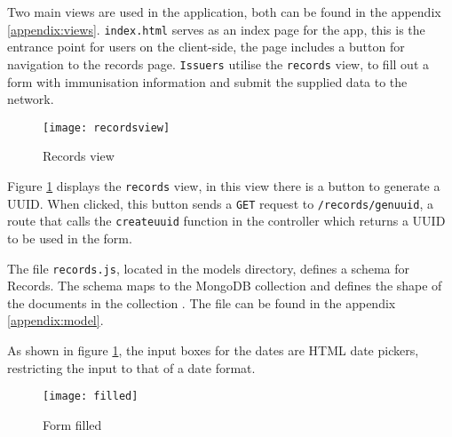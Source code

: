 Two main views are used in the application, both can be found in the appendix \ref{appendix:views}. 
\lstinline{index.html} serves as an index page for the app, this is the entrance point for users on the client-side, the page includes a button for navigation to the records page.
\lstinline{Issuers} utilise the \lstinline{records} view, to fill out a form with immunisation information and submit the supplied data to the network. 

\begin{figure}[H]
  \texttt{[image: recordsview]}
  \caption{Records view}
  \label{fig:recordsview}
\end{figure}

Figure \ref{fig:recordsview} displays the \lstinline{records} view, in this view there is a button to generate a UUID. 
When clicked, this button sends a \lstinline{GET} request to \lstinline{/records/genuuid}, a route that calls the \lstinline{createuuid} function in the controller which returns a UUID to be used in the form. 

The file \lstinline{records.js}, located in the models directory, defines a schema for Records. 
The schema maps to the MongoDB collection and defines the shape of the documents in the collection \cite{noauthor_mongoose_nodate}. 
The file can be found in the appendix \ref{appendix:model}.

As shown in figure \ref{fig:recordsview}, the input boxes for the dates are HTML date pickers, restricting the input to that of a date format. 

\begin{figure}[H]
  \texttt{[image: filled]}
  \caption{Form filled}
  \label{fig:filled}
\end{figure}

